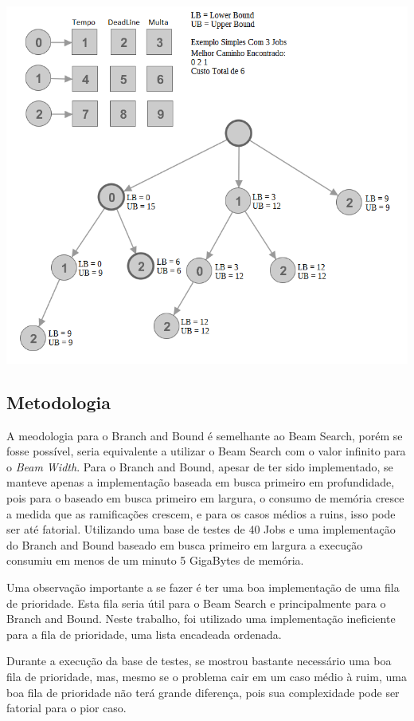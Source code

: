 \documentclass[a4paper,12pt]{article}
\begin{document}
\includegraphics[width=145mm]{bb.png}\\[1cm] \label{bbimg}

\subsection{Metodologia}

A meodologia para o Branch and Bound é semelhante ao Beam Search, porém se fosse possível, seria equivalente 
a utilizar o Beam Search com o valor infinito para o \emph{Beam Width}.
Para o Branch and Bound, apesar de ter sido implementado, se manteve apenas a implementação baseada em 
busca primeiro em profundidade, pois para o baseado em busca primeiro em largura, o consumo de memória cresce 
a medida que as ramificações crescem, e para os casos médios a ruins, isso pode ser até fatorial. Utilizando 
uma base de testes de 40 Jobs e uma implementação do Branch and Bound baseado em busca primeiro em largura 
a execução consumiu em menos de um minuto 5 GigaBytes de memória.

Uma observação importante a se fazer é ter uma boa implementação de uma fila de prioridade. Esta fila seria útil 
para o Beam Search e principalmente para o Branch and Bound. Neste trabalho, foi utilizado uma implementação 
ineficiente para a fila de prioridade, uma lista encadeada ordenada.

Durante a execução da base de testes, se mostrou bastante necessário uma boa fila de prioridade, mas, mesmo se 
o problema cair em um caso médio à ruim, uma boa fila de prioridade não terá grande diferença, pois sua 
complexidade pode ser fatorial para o pior caso.
\end{document}
